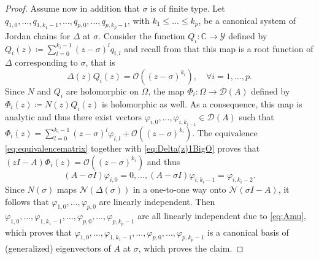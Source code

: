 \documentclass[english]{myarticle}
\begin{document}
\begin{sloppypar}
\begin{proof}
Assume now in addition that $\sigma$ is of finite type. Let $q_{1,0},\dots,q_{1,k_1 - 1},\dots,q_{p,0},\dots,q_{p,k_p - 1}$, with $k_1 \leq \dots \leq k_p$, be a canonical system of Jordan chains for $\Delta$ at $\sigma$. Consider the function $Q_i : \mathbb{C} \to \mathcal{Y}$ defined by $Q_i(z) \coloneqq \sum_{l=0}^{k_i - 1} (z-\sigma)^l q_{i,l}$ and recall from  that this map is a root function of $\Delta$ corresponding to $\sigma$, that is
\begin{equation} \label{eq:Delta(z)1BigO}
    \Delta(z) Q_i(z) = \mathcal{O}((z-\sigma)^{k_i}), \quad \forall i =1,\dots,p.
\end{equation}
Since $N$ and $Q_i$ are holomorphic on $\Omega$, the map $\Phi_i : \Omega \to \mathcal{D}(A)$ defined by $\Phi_i(z) \coloneqq N(z) Q_i(z)$ is holomorphic as well. As a consequence, this map is analytic and thus there exist vectors $\varphi_{i,0},\dots,\varphi_{i,k_{i-1}} \in \mathcal{D}(A)$ such that $\Phi_i(z) = \sum_{l=0}^{k_i - 1} (z-\sigma)^l \varphi_{i,l} + \mathcal{O}((z-\sigma)^{k_i})$. The equivalence \eqref{eq:equivalencematrix} together with \eqref{eq:Delta(z)1BigO} proves that $(zI - A)\Phi_i(z) = \mathcal{O}((z-\sigma)^{k_i})$ and thus
\begin{equation} \label{eq:Amu}
    (A-\sigma I)\varphi_{i,0} = 0, \dots,(A-\sigma I)\varphi_{i,k_i - 1} = \varphi_{i,k_i - 2}.
\end{equation}
Since $N(\sigma)$ maps $\mathcal{N} (\Delta(\sigma))$ in a one-to-one way onto $\mathcal{N}(\sigma I-A)$, it follows that $\varphi_{1,0},\dots,\varphi_{p,0}$ are linearly independent. Then $\varphi_{1,0},\dots,\varphi_{1,k_1 - 1},\dots,\varphi_{p,0},\dots,\varphi_{p,k_p - 1}$ are all linearly independent due to \eqref{eq:Amu}, which proves that $\varphi_{1,0},\dots,\varphi_{1,k_1 - 1},\dots,\varphi_{p,0},\dots,\varphi_{p,k_p - 1}$ is a canonical basis of (generalized) eigenvectors of $A$ at $\sigma$, which proves the claim.


\end{proof}
\end{sloppypar}
\end{document}
